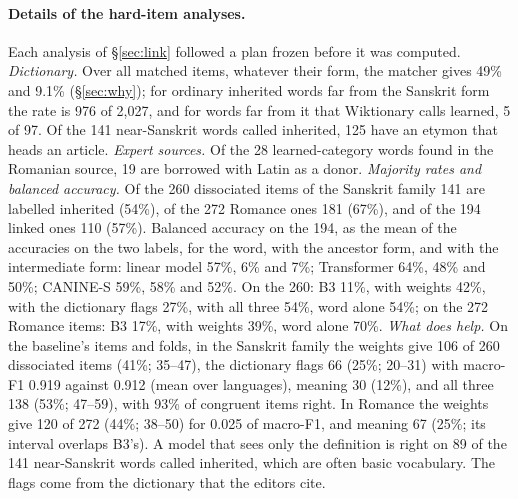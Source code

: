 \documentclass[11pt]{article}
\begin{document}
\paragraph{Details of the hard-item analyses.} Each analysis of \S\ref{sec:link} followed a plan frozen before it was computed. \textit{Dictionary.} Over all matched items, whatever their form, the matcher gives 49\% and 9.1\% (\S\ref{sec:why}); for ordinary inherited words far from the Sanskrit form the rate is 976 of 2,027, and for words far from it that Wiktionary calls learned, 5 of 97. Of the 141 near-Sanskrit words called inherited, 125 have an etymon that heads an article. \textit{Expert sources.} Of the 28 learned-category words found in the Romanian source, 19 are borrowed with Latin as a donor. \textit{Majority rates and balanced accuracy.} Of the 260 dissociated items of the Sanskrit family 141 are labelled inherited (54\%), of the 272 Romance ones 181 (67\%), and of the 194 linked ones 110 (57\%). Balanced accuracy on the 194, as the mean of the accuracies on the two labels, for the word, with the ancestor form, and with the intermediate form: linear model 57\%, 6\% and 7\%; Transformer 64\%, 48\% and 50\%; CANINE-S 59\%, 58\% and 52\%. On the 260: B3 11\%, with weights 42\%, with the dictionary flags 27\%, with all three 54\%, word alone 54\%; on the 272 Romance items: B3 17\%, with weights 39\%, word alone 70\%. \textit{What does help.} On the baseline's items and folds, in the Sanskrit family the weights give 106 of 260 dissociated items (41\%; 35--47), the dictionary flags 66 (25\%; 20--31) with macro-F1 0.919 against 0.912 (mean over languages), meaning 30 (12\%), and all three 138 (53\%; 47--59), with 93\% of congruent items right. In Romance the weights give 120 of 272 (44\%; 38--50) for 0.025 of macro-F1, and meaning 67 (25\%; its interval overlaps B3's). A model that sees only the definition is right on 89 of the 141 near-Sanskrit words called inherited, which are often basic vocabulary. The flags come from the dictionary that the editors cite.
\end{document}
